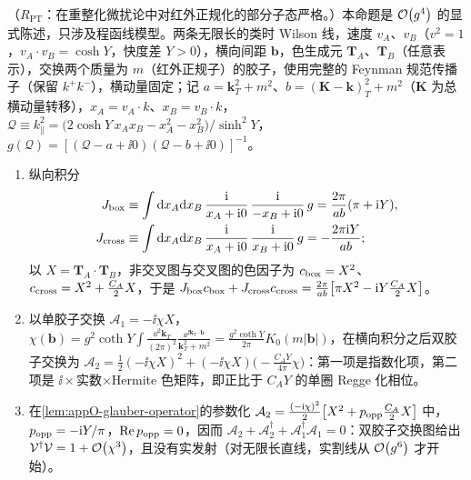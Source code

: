 \begin{proposition}\label{prop:dy-eikonal-twogluon}
（$R_{\mathrm{PT}}$：在重整化微扰论中对红外正规化的部分子态严格。）本命题是 $\mathcal{O}\!\left(g^4\right)$ 的显式陈述，只涉及程函线模型。两条无限长的类时 Wilson 线，速度 $v_A$、$v_B$（$v^2=1$，$v_A\cdot v_B=\cosh Y$，快度差 $Y>0$），横向间距 $\boldsymbol b$，色生成元 $\mathbf T_A$、$\mathbf T_B$（任意表示），交换两个质量为 $m$（红外正规子）的胶子，使用完整的 Feynman 规范传播子（保留 $k^+k^-$），横动量固定；记 $a=\mathbf k_T^2+m^2$、$b=(\mathbf K-\mathbf k)_T^2+m^2$（$\mathbf K$ 为总横动量转移），$x_A=v_A\cdot k$、$x_B=v_B\cdot k$，$\mathcal Q\equiv k_\parallel^2=\big(2\cosh Y\,x_Ax_B-x_A^2-x_B^2\big)/\sinh^2Y$，$g(\mathcal Q)=[(\mathcal Q-a+\ii0)(\mathcal Q-b+\ii0)]^{-1}$。
\begin{enumerate}[label=(\alph*),leftmargin=2.2em,itemsep=1pt,topsep=2pt]
\item 纵向积分
\begin{equation}\label{eq:dy-Jbox}
\begin{aligned}
J_{\rm box}&\equiv\int\mathrm{d} x_A\mathrm{d} x_B\,\frac{\mathrm{i}}{x_A+\mathrm{i}0}\,\frac{\mathrm{i}}{-x_B+\mathrm{i}0}\,g=\frac{2\pi}{ab}(\pi+\mathrm{i} Y),\\
J_{\rm cross}&\equiv\int\mathrm{d} x_A\mathrm{d} x_B\,\frac{\mathrm{i}}{x_A+\mathrm{i}0}\,\frac{\mathrm{i}}{x_B+\mathrm{i}0}\,g=-\frac{2\pi\mathrm{i} Y}{ab};
\end{aligned}
\end{equation}
以 $X=\mathbf T_A\cdot\mathbf T_B$，非交叉图与交叉图的色因子为 $c_{\rm box}=X^2$、$c_{\rm cross}=X^2+\frac{C_A}2X$，于是
$J_{\rm box}c_{\rm box}+J_{\rm cross}c_{\rm cross}=\frac{2\pi}{ab}\big[\pi X^2-\mathrm{i} Y\frac{C_A}2X\big]$。
\item 以单胶子交换 $\mathcal A_1=-\ii\chi X$，$\chi(\boldsymbol b)=g^2\coth Y\int\frac{\dd^2\mathbf k_T}{(2\pi)^2}\frac{\ee^{\ii\mathbf k_T\cdot\boldsymbol b}}{\mathbf k_T^2+m^2}=\frac{g^2\coth Y}{2\pi}K_0(m|\boldsymbol b|)$，在横向积分之后双胶子交换为
$\mathcal A_2=\frac12(-\ii\chi X)^2+(-\ii\chi X)\big(-\frac{C_AY}{4\pi}\chi\big)$：第一项是指数化项，第二项是 $\ii\times$实数$\times$Hermite 色矩阵，即正比于 $C_AY$ 的单圈 Regge 化相位。
\item 在\cref{lem:appO-glauber-operator}的参数化 $\mathcal A_2=\frac{(-\mathrm{i}\chi)^2}{2}\big[X^2+p_{\rm opp}\frac{C_A}2X\big]$ 中，$p_{\rm opp}=-\mathrm{i} Y/\pi$，$\operatorname{Re} p_{\rm opp}=0$，因而 $\mathcal A_2+\mathcal A_2^\dagger+\mathcal A_1^\dagger\mathcal A_1=0$：双胶子交换图给出 $\mathcal V^\dagger\mathcal V=1+\mathcal{O}\!\left(\chi^3\right)$，且没有实发射（对无限长直线，实割线从 $\mathcal{O}\!\left(g^6\right)$ 才开始）。
\end{enumerate}
\end{proposition}

